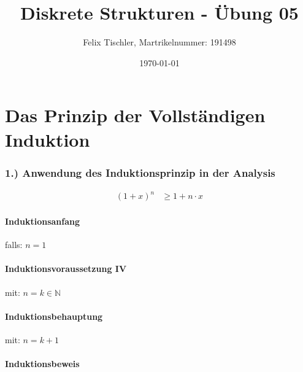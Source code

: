 \documentclass[titlepage]{article}
\newcommand{\N}{\mathbb{N}}
\begin{document}
	
	\title{Diskrete Strukturen - Übung 05}
	\author{Felix Tischler, Martrikelnummer: 191498}
	\date{\today}
	\maketitle
	
	\part*{Das Prinzip der Vollständigen Induktion}
	\section*{1.) Anwendung des Induktionsprinzip in der Analysis}
		\begin{align*}
			(1+x)^n&\ge1+n\cdot x
		\end{align*}
		\subsection*{Induktionsanfang} falls: $n=1$\\
		\subsection*{Induktionsvoraussetzung IV}
		mit: $n=k\in\N$\\
		\subsection*{Induktionsbehauptung}
		mit: $n=k+1$\\
		\subsection*{Induktionsbeweis}
\end{document}
